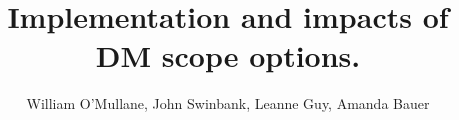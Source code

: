 \documentclass[DM,TN,lsstdraft]{lsstdoc}
\title[DM scope options] {Implementation and impacts of DM scope options.}
\author   {William O'Mullane, John Swinbank, Leanne Guy, Amanda Bauer}
\begin{document}
\mkshorttitle






\appendix


\end{document}
